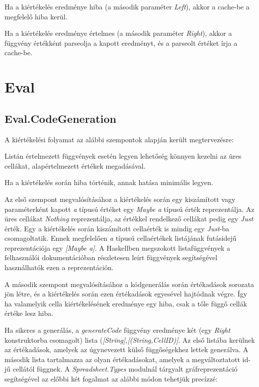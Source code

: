 \begin{compactenum}
	\item Ha a kiértékelés eredménye hiba (a második paraméter \textit{Left}), akkor a cache-be a megfelelő hiba kerül.
	\item Ha a kiértékelés eredménye értelmes (a második paraméter \textit{Right}), akkor a függvény értékként parseolja a kapott eredményt, és a parseolt értéket írja a cache-be.
\end{compactenum}

\section{Eval}

\subsection{Eval.CodeGeneration}

A kiértékelési folyamat az alábbi szempontok alapján került megtervezésre:
\begin{compactenum}
	\item Listán értelmezett függvények esetén legyen lehetőség könnyen kezelni az üres cellákat, alapértelmezett értékek megadásával.
	\item Ha a kiértékelés során hiba történik, annak hatása minimális legyen.
\end{compactenum}

Az első szempont megvalósításához a kiértékelés során egy kiszámított vagy paraméterként kapott \textit{a} típusú értéket egy \textit{Maybe a} típusú érték reprezentálja. Az üres cellákat \textit{Nothing} reprezentálja, az értékkel rendelkező cellákat pedig egy \textit{Just} érték. Egy a kiértékelés során kiszámított cellaérték is mindig egy \textit{Just}-ba csomagoltatik. Ennek megfelelően \textit{a} típusú cellaértékek listájának futásidejű reprezentációja egy \textit{[Maybe a]}. A Haskellben megszokott listafüggvények a felhasználói dokumentációban részletesen leírt függvények segítségével használhatók ezen a reprezentáción.

A második szempont megvalósításához a kódgenerálás során értékadások sorozata jön létre, és a kiértékelés során ezen értékadások egyesével hajtódnak végre. Így ha valamelyik cella kiértékelésének eredménye egy hiba, csak a tőle függő cellák értéke lesz hiba. 

Ha sikeres a generálás, a \textit{generateCode} függvény eredménye két (egy \textit{Right} konstruktorba csomagolt) lista (\textit{[String],[(String,CellID)]}. Az első listába kerülnek az értékadások, amelyek az úgynevezett külső függőségekhez lettek generálva. A második lista tartalmazza az olyan értékadásokat, amelyek a megváltoztatott id-jű cellától függnek. A \textit{Spreadsheet.Types} modulnál tárgyalt gráfreprezentáció segítségével az előbbi két fogalmat az alábbi módon tehetjük precízzé: 


